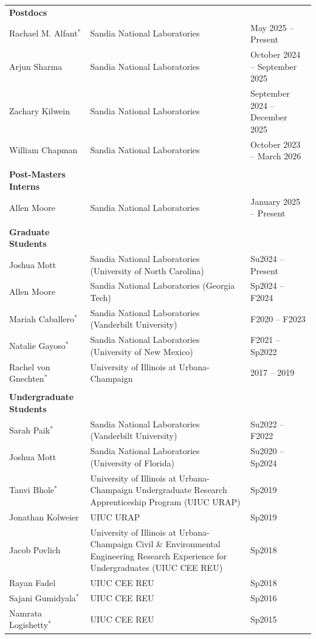 \documentclass{article}[12pt]
\begin{document}
	\vspace{-0.5em}
	\begin{tabularx}{\textwidth}{lXl}
		\textbf{Postdocs} \\
		Rachael M. Alfant\small{$^{*}$} & Sandia National Laboratories & May 2025 -- Present \\
		Arjun Sharma & Sandia National Laboratories & October 2024 -- September 2025 \\
		Zachary Kilwein & Sandia National Laboratories & September 2024 -- December 2025\\
		William Chapman & Sandia National Laboratories & October 2023 -- March 2026 \\
		\\
		\textbf{Post-Masters Interns}\\
		Allen Moore & Sandia National Laboratories & January 2025 -- Present \\
		\\
		\textbf{Graduate Students} \\
		Joshua Mott & Sandia National Laboratories \newline (University of North Carolina) &  Su2024 -- Present \\
		Allen Moore & Sandia National Laboratories (Georgia Tech) & Sp2024 -- F2024 \\
		Mariah Caballero\small{$^{*}$} & Sandia National Laboratories \newline (Vanderbilt University) & F2020 -- F2023 \\
		Natalie Gayoso\small{$^{*}$} & Sandia National Laboratories (University of New Mexico) &  F2021 -- Sp2022 \\
		Rachel von Gnechten\small{$^{*}$} & University of Illinois at Urbana-Champaign & 2017 -- 2019\\
		\\
		\textbf{Undergraduate Students} \\
		Sarah Paik\small{$^{*}$} & Sandia National Laboratories (Vanderbilt University) & Su2022 -- F2022 \\
		Joshua Mott & Sandia National Laboratories (University of Florida) &  Su2020 -- Sp2024 \\
		Tanvi Bhole\small{$^{*}$}  & University of Illinois at Urbana-Champaign Undergraduate Research Apprenticeship Program (UIUC URAP) &  Sp2019 \\
		Jonathan Kolweier  & UIUC URAP & Sp2019 \\
		Jacob Povlich  & University of Illinois at Urbana-Champaign Civil \& Environmental Engineering Research Experience for Undergraduates (UIUC CEE REU) & Sp2018 \\
		Rayan Fadel  & UIUC CEE REU & Sp2018 \\
		Sajani Gumidyala\small{$^{*}$}   & UIUC CEE REU & Sp2016 \\
		Namrata Logishetty\small{$^{*}$}  & UIUC CEE REU & Sp2015 \\
	\end{tabularx}
	
\end{document}
